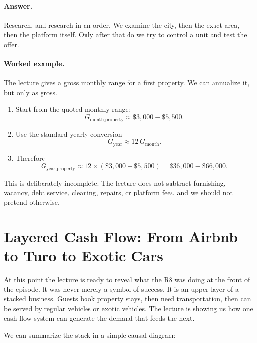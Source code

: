 \paragraph{Answer.} Research, and research in an order. We examine the city, then the exact area, then the platform itself. Only after that do we try to control a unit and test the offer.

\paragraph{Worked example.} The lecture gives a gross monthly range for a first property. We can annualize it, but only as gross.
\begin{enumerate}
\item Start from the quoted monthly range:
\[
G_{\text{month,property}} \approx \$3{,}000-\$5{,}500.
\]
\item Use the standard yearly conversion
\[
G_{\text{year}} \approx 12\,G_{\text{month}}.
\]
\item Therefore
\[
G_{\text{year,property}} \approx 12\times(\$3{,}000-\$5{,}500)
= \$36{,}000-\$66{,}000.
\]
\end{enumerate}

This is deliberately incomplete. The lecture does not subtract furnishing, vacancy, debt service, cleaning, repairs, or platform fees, and we should not pretend otherwise.

\section{Layered Cash Flow: From Airbnb to Turo to Exotic Cars}

At this point the lecture is ready to reveal what the R8 was doing at the front of the episode. It was never merely a symbol of success. It is an upper layer of a stacked business. Guests book property stays, then need transportation, then can be served by regular vehicles or exotic vehicles. The lecture is showing us how one cash-flow system can generate the demand that feeds the next.

We can summarize the stack in a simple causal diagram:
\begin{figure}
\centering
{}
\end{figure}

